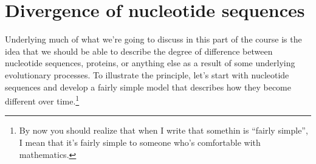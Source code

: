 \section*{Divergence of nucleotide sequences}

Underlying much of what we're going to discuss in this part of the
course is the idea that we should be able to describe the degree of
difference between nucleotide sequences, proteins, or anything else as
a result of some underlying evolutionary processes. To illustrate the
principle, let's start with nucleotide sequences and develop a fairly
simple model that describes how they become different over
time.\footnote{By now you should realize that when I write that
  somethin is ``fairly simple'', I mean that it's fairly simple to
  someone who's comfortable with mathematics.}

